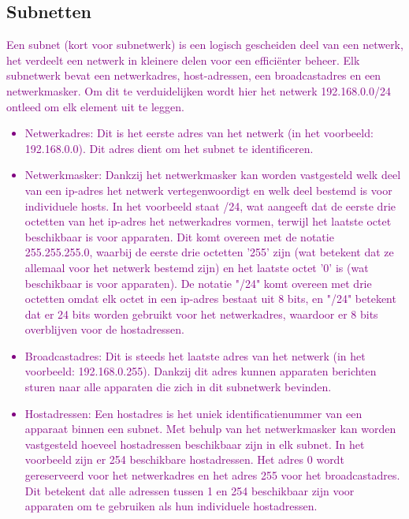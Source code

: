 {\subsection{Subnetten}
\textcolor{purple}{Een subnet (kort voor subnetwerk) is een logisch gescheiden deel van een netwerk, het verdeelt een netwerk in kleinere delen voor een efficiënter beheer. Elk subnetwerk bevat een netwerkadres, host-adressen, een broadcastadres en een netwerkmasker. Om dit te verduidelijken wordt hier het netwerk 192.168.0.0/24 ontleed om elk element uit te leggen.}
\textcolor{purple}{
\begin{itemize}
    \item Netwerkadres: Dit is het eerste adres van het netwerk (in het voorbeeld: 192.168.0.0). Dit adres dient om het subnet te identificeren.
    \item Netwerkmasker: Dankzij het netwerkmasker kan worden vastgesteld welk deel van een \acrshort{ip}-adres het netwerk vertegenwoordigt en welk deel bestemd is voor individuele hosts. In het voorbeeld staat /24, wat aangeeft dat de eerste drie octetten van het \acrshort{ip}-adres het netwerkadres vormen, terwijl het laatste octet beschikbaar is voor apparaten. Dit komt overeen met de notatie 255.255.255.0, waarbij de eerste drie octetten '255' zijn (wat betekent dat ze allemaal voor het netwerk bestemd zijn) en het laatste octet '0' is (wat beschikbaar is voor apparaten). De notatie "/24" komt overeen met drie octetten omdat elk octet in een \acrshort{ip}-adres bestaat uit 8 bits, en "/24" betekent dat er 24 bits worden gebruikt voor het netwerkadres, waardoor er 8 bits overblijven voor de hostadressen.      
    \item Broadcastadres: Dit is steeds het laatste adres van het netwerk (in het voorbeeld: 192.168.0.255). Dankzij dit adres kunnen apparaten berichten sturen naar alle apparaten die zich in dit subnetwerk bevinden.
    \item Hostadressen: Een hostadres is het uniek identificatienummer van een apparaat binnen een subnet. Met behulp van het netwerkmasker kan worden vastgesteld hoeveel hostadressen beschikbaar zijn in elk subnet. In het voorbeeld zijn er 254 beschikbare hostadressen. Het adres 0 wordt gereserveerd voor het netwerkadres en het adres 255 voor het broadcastadres. Dit betekent dat alle adressen tussen 1 en 254 beschikbaar zijn voor apparaten om te gebruiken als hun individuele hostadressen.
\end{itemize}
}

}
